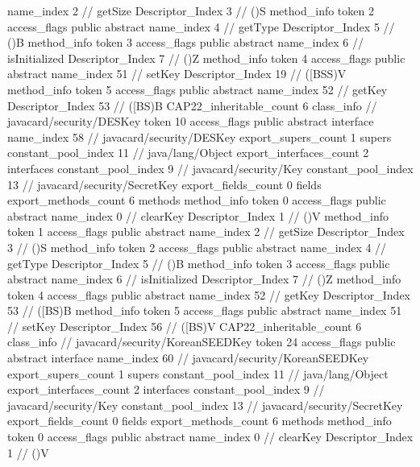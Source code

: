 {{{{{					name_index	2		// getSize
					Descriptor_Index	3		// ()S
				}
				method_info {
					token	2
					access_flags	public abstract
					name_index	4		// getType
					Descriptor_Index	5		// ()B
				}
				method_info {
					token	3
					access_flags	public abstract
					name_index	6		// isInitialized
					Descriptor_Index	7		// ()Z
				}
				method_info {
					token	4
					access_flags	public abstract
					name_index	51		// setKey
					Descriptor_Index	19		// ([BSS)V
				}
				method_info {
					token	5
					access_flags	public abstract
					name_index	52		// getKey
					Descriptor_Index	53		// ([BS)B
				}
			}
			CAP22_inheritable_count	6
		}
		class_info {		// javacard/security/DESKey
			token	10
			access_flags	public abstract interface
			name_index	58		// javacard/security/DESKey
			export_supers_count	1
			supers {
				constant_pool_index	11		// java/lang/Object
			}
			export_interfaces_count	2
			interfaces {
				constant_pool_index	9		// javacard/security/Key
				constant_pool_index	13		// javacard/security/SecretKey
			}
			export_fields_count	0
			fields {
			}
			export_methods_count	6
			methods {
				method_info {
					token	0
					access_flags	public abstract
					name_index	0		// clearKey
					Descriptor_Index	1		// ()V
				}
				method_info {
					token	1
					access_flags	public abstract
					name_index	2		// getSize
					Descriptor_Index	3		// ()S
				}
				method_info {
					token	2
					access_flags	public abstract
					name_index	4		// getType
					Descriptor_Index	5		// ()B
				}
				method_info {
					token	3
					access_flags	public abstract
					name_index	6		// isInitialized
					Descriptor_Index	7		// ()Z
				}
				method_info {
					token	4
					access_flags	public abstract
					name_index	52		// getKey
					Descriptor_Index	53		// ([BS)B
				}
				method_info {
					token	5
					access_flags	public abstract
					name_index	51		// setKey
					Descriptor_Index	56		// ([BS)V
				}
			}
			CAP22_inheritable_count	6
		}
		class_info {		// javacard/security/KoreanSEEDKey
			token	24
			access_flags	public abstract interface
			name_index	60		// javacard/security/KoreanSEEDKey
			export_supers_count	1
			supers {
				constant_pool_index	11		// java/lang/Object
			}
			export_interfaces_count	2
			interfaces {
				constant_pool_index	9		// javacard/security/Key
				constant_pool_index	13		// javacard/security/SecretKey
			}
			export_fields_count	0
			fields {
			}
			export_methods_count	6
			methods {
				method_info {
					token	0
					access_flags	public abstract
					name_index	0		// clearKey
					Descriptor_Index	1		// ()V
				}
}}}}
